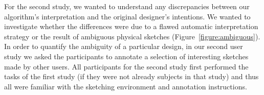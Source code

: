 For the second study, we wanted to understand any discrepancies
between our algorithm's interpretation and the original designer's
intentions.  We wanted to investigate whether the differences were due
to a flawed automatic interpretation strategy or the result of
ambiguous physical sketches (Figure~\ref{figure:ambiguous}).  In order
to quantify the ambiguity of a particular design, in our second user
study we asked the participants to annotate a selection of interesting
sketches made by other users.  All participants for the second study
first performed the tasks of the first study (if they were not already
subjects in that study) and thus all were familiar with the sketching
environment and annotation instructions.


\begin{figure}[t]

\end{figure}
